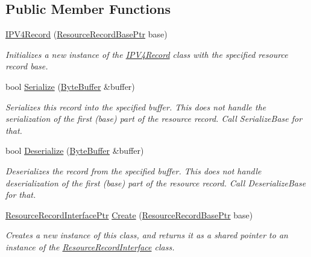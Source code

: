 \subsection*{Public Member Functions}
\begin{DoxyCompactItemize}
\item 
\hyperlink{class_senergy_1_1_dns_1_1_i_p_v4_record_a9239e0aa9254080bb92ab1ba8352bd56}{I\-P\-V4\-Record} (\hyperlink{namespace_senergy_1_1_dns_a72915c893fbf242018e79d8f92e1646b}{Resource\-Record\-Base\-Ptr} base)
\begin{DoxyCompactList}\small\item\em Initializes a new instance of the \hyperlink{class_senergy_1_1_dns_1_1_i_p_v4_record}{I\-P\-V4\-Record} class with the specified resource record base. \end{DoxyCompactList}\item 
bool \hyperlink{class_senergy_1_1_dns_1_1_i_p_v4_record_adc8bfc217949628f7b88fe69d065d630}{Serialize} (\hyperlink{class_senergy_1_1_byte_buffer}{Byte\-Buffer} \&buffer)
\begin{DoxyCompactList}\small\item\em Serializes this record into the specified buffer. This does not handle the serialization of the first (base) part of the resource record. Call Serialize\-Base for that. \end{DoxyCompactList}\item 
bool \hyperlink{class_senergy_1_1_dns_1_1_i_p_v4_record_a6fffdc2823b53f8f2fede5263e45b232}{Deserialize} (\hyperlink{class_senergy_1_1_byte_buffer}{Byte\-Buffer} \&buffer)
\begin{DoxyCompactList}\small\item\em Deserializes the record from the specified buffer. This does not handle deserialization of the first (base) part of the resource record. Call Deserialize\-Base for that. \end{DoxyCompactList}\item 
\hyperlink{class_senergy_1_1_dns_1_1_resource_record_interface_abf5eec20c95f05b57c5c02eaed349e16}{Resource\-Record\-Interface\-Ptr} \hyperlink{class_senergy_1_1_dns_1_1_i_p_v4_record_a4d31a8d3f562f8128c053071120d6dd2}{Create} (\hyperlink{namespace_senergy_1_1_dns_a72915c893fbf242018e79d8f92e1646b}{Resource\-Record\-Base\-Ptr} base)
\begin{DoxyCompactList}\small\item\em Creates a new instance of this class, and returns it as a shared pointer to an instance of the \hyperlink{class_senergy_1_1_dns_1_1_resource_record_interface}{Resource\-Record\-Interface} class. \end{DoxyCompactList}\item 

\end{DoxyCompactItemize}
